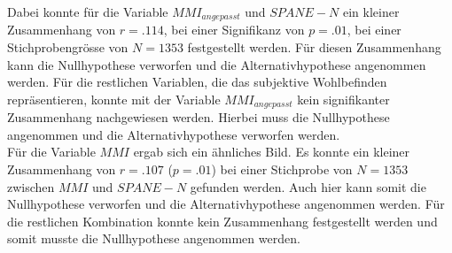 Dabei konnte für die Variable $MMI_{angepasst}$ und $SPANE-N$ ein kleiner Zusammenhang von $r=.114$, bei einer Signifikanz von $p=.01$, bei einer Stichprobengrösse von $N=1353$ festgestellt werden. Für diesen Zusammenhang kann die Nullhypothese verworfen und die Alternativhypothese angenommen werden. Für die restlichen Variablen, die das subjektive Wohlbefinden repräsentieren, konnte mit der Variable $MMI_{angepasst}$ kein signifikanter Zusammenhang nachgewiesen werden. Hierbei muss die Nullhypothese angenommen und die Alternativhypothese verworfen werden.\\
Für die Variable $MMI$ ergab sich ein ähnliches Bild. Es konnte ein kleiner Zusammenhang von $r=.107$ ($p=.01$) bei einer Stichprobe von $N=1353$ zwischen $MMI$ und $SPANE-N$ gefunden werden. Auch hier kann somit die Nullhypothese verworfen und die Alternativhypothese angenommen werden. Für die restlichen Kombination konnte kein Zusammenhang festgestellt werden und somit musste die Nullhypothese angenommen werden.

